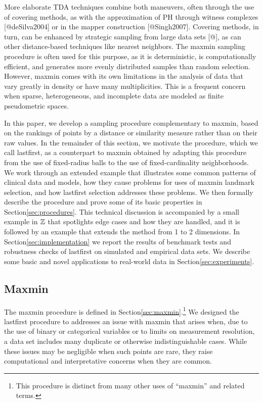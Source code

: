 \documentclass[
]{article}
\begin{document}
More elaborate TDA techniques combine both maneuvers, often through the
use of covering methods, as with the approximation of PH through witness
complexes {[}@deSilva2004{]} or in the mapper construction
{[}@Singh2007{]}. Covering methods, in turn, can be enhanced by
strategic sampling from large data sets {[}@{]}, as can other
distance-based techniques like nearest neighbors. The maxmin sampling
procedure is often used for this purpose, as it is deterministic, is
computationally efficient, and generates more evenly distributed samples
than random selection. However, maxmin comes with its own limitations in
the analysis of data that vary greatly in density or have many
multiplicities. This is a frequent concern when sparse, heterogeneous,
and incomplete data are modeled as finite pseudometric spaces.

In this paper, we develop a sampling procedure complementary to maxmin,
based on the rankings of points by a distance or similarity measure
rather than on their raw values. In the remainder of this section, we
motivate the procedure, which we call lastfirst, as a counterpart to
maxmin obtained by adapting this procedure from the use of fixed-radius
balls to the use of fixed-cardinality neighborhoods. We work through an
extended example that illustrates some common patterns of clinical data
and models, how they cause problems for uses of maxmin landmark
selection, and how lastfirst selection addresses these problems. We then
formally describe the procedure and prove some of its basic properties
in Section\nbs\ref{sec:procedures}. This technical discussion is
accompanied by a small example in \(\mathbb{Z}\) that spotlights edge cases and
how they are handled, and it is followed by an example that extends the
method from 1 to 2 dimensions. In Section\nbs\ref{sec:implementation} we
report the results of benchmark tests and robustness checks of lastfirst
on simulated and empirical data sets. We describe some basic and novel
applications to real-world data in Section\nbs\ref{sec:experiments}.

\hypertarget{maxmin}{%
\subsection{Maxmin}\label{maxmin}}

The maxmin procedure is defined in
Section\nbs\ref{sec:maxmin}.\footnote{This procedure is distinct from
  many other uses of ``maxmin'' and related terms.} We designed the
lastfirst procedure to addresses an issue with maxmin that arises when,
due to the use of binary or categorical variables or to limits on
measurement resolution, a data set includes many duplicate or otherwise
indistinguishable cases. While these issues may be negligible when such
points are rare, they raise computational and interpretative concerns
when they are common.
\end{document}
